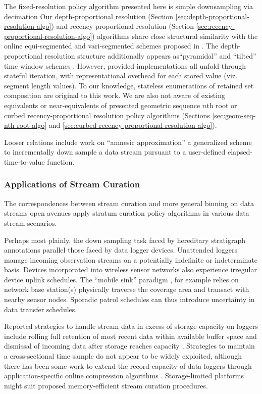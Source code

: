 The fixed-resolution policy algorithm presented here is simple downsampling via decimation \citep[p. 31]{crochiere1983multirate}
Our depth-proportional resolution (Section \ref{sec:depth-proportional-resolution-algo}) and recency-proportional resolution (Section \ref{sec:recency-proportional-resolution-algo}) algorithms share close structural similarity with the online equi-segmented and vari-segmented schemes proposed in
\citep{zhao2005generalized}.
The depth-proportional resolution structure additionally appears as``pyramidal'' and ``tilted'' time window schemes \citep{aggarwal2003framework,han2005stream}.
However, provided implementations all unfold through stateful iteration, with representational overhead for each stored value (viz. segment length values).
To our knowledge, stateless enumerations of retained set composition are original to this work.
We are also not aware of existing equivalents or near-equivalents of presented geometric sequence $n$th root or curbed recency-proportional resolution policy algorithms (Sections \ref{sec:geom-seq-nth-root-algo} and \ref{sec:curbed-recency-proportional-resolution-algo}).

Looser relations include work on ``amnesic approximation'' a generalized scheme to incrementally down sample a data stream pursuant to a user-defined elapsed-time-to-value function.

\subsubsection{Applications of Stream Curation}

The correspondences between stream curation and more general binning on data streams open avenues apply stratum curation policy algorithms in various data stream scenarios.

Perhaps most plainly, the down sampling task faced by hereditary stratigraph annotations parallel those faced by data logger devices.
Unattended loggers manage incoming observation streams on a potentially indefinite or indeterminate basis.
Devices incorporated into wireless sensor networks also experience irregular device uplink schedules.
The ``mobile sink'' paradigm \citep{jain2022survey}, for example relies on network base station(s) physically traverse the coverage area and transact with nearby sensor nodes.
Sporadic patrol schedules can thus introduce uncertainty in data transfer schedules.

Reported strategies to handle stream data in excess of storage capacity on loggers include rolling full retention of most recent data within available buffer space \citep{fincham1995use} and dismissal of incoming data after storage reaches capacity \citep{saunders1989portable,mahzan2017design},
Strategies to maintain a cross-sectional time sample do not appear to be widely exploited, although there has been some work to extend the record capacity of data loggers through application-specific online compression algorithms \citep{hadiatna2016design}.
Storage-limited platforms might suit proposed memory-efficient stream curation procedures.
